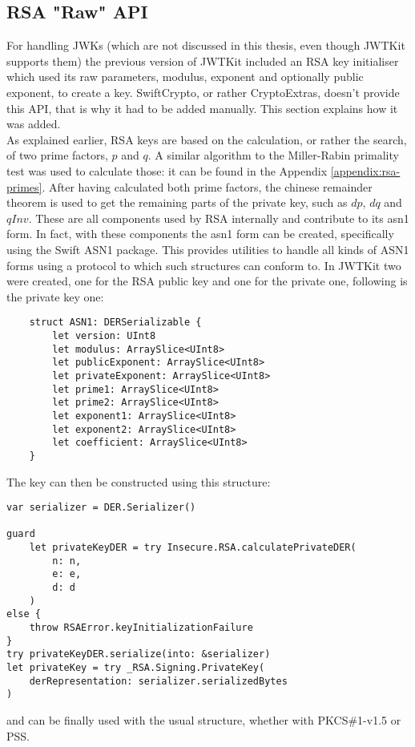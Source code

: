 \subsection{RSA "Raw" API}
For handling JWKs (which are not discussed in this thesis, even though JWTKit supports them) the previous version of JWTKit included an RSA key initialiser which used its raw parameters, modulus, exponent and optionally public exponent, to create a key. SwiftCrypto, or rather CryptoExtras, doesn't provide this API, that is why it had to be added manually. This section explains how it was added. \\
As explained earlier, RSA keys are based on the calculation, or rather the search, of two prime factors, $p$ and $q$. A similar algorithm to the Miller-Rabin primality test was used to calculate those: it can be found in the Appendix \ref{appendix:rsa-primes}. \cite{rsa-algo} After having calculated both prime factors, the chinese remainder theorem \cite{chinese-remainder-th} is used to get the remaining parts of the private key, such as $dp$, $dq$ and $qInv$. These are all components used by RSA internally and contribute to its \gls{asn1} form. In fact, with these components the \gls{asn1} form can be created, specifically using the Swift ASN1 package. This provides utilities to handle all kinds of ASN1 forms using a  protocol to which such structures can conform to. In JWTKit two were created, one for the RSA public key and one for the private one, following is the private key one:
\begin{verbatim}
    struct ASN1: DERSerializable {
        let version: UInt8
        let modulus: ArraySlice<UInt8>
        let publicExponent: ArraySlice<UInt8>
        let privateExponent: ArraySlice<UInt8>
        let prime1: ArraySlice<UInt8>
        let prime2: ArraySlice<UInt8>
        let exponent1: ArraySlice<UInt8>
        let exponent2: ArraySlice<UInt8>
        let coefficient: ArraySlice<UInt8>
    }
\end{verbatim} 
\cite{rfc8017-rsapkcs} 
The key can then be constructed using this structure:
\begin{verbatim}
var serializer = DER.Serializer()

guard 
    let privateKeyDER = try Insecure.RSA.calculatePrivateDER(
        n: n, 
        e: e, 
        d: d
    ) 
else {
    throw RSAError.keyInitializationFailure
}
try privateKeyDER.serialize(into: &serializer)
let privateKey = try _RSA.Signing.PrivateKey(
    derRepresentation: serializer.serializedBytes
)
\end{verbatim}
and can be finally used with the usual structure, whether with PKCS\#1-v1.5 or PSS. \cite{jwtkit}
